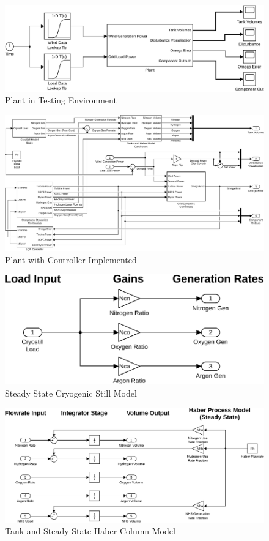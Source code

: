 \begin{figure}[p]
\centering
        \includegraphics[scale=0.7]{images/plant/global.pdf}
        \caption{Plant in Testing Environment}
        \label{fig:global}
\end{figure}
\begin{figure}[p]
\centering
        \includegraphics[scale=0.6]{images/plant2/plant.pdf}
    \caption{Plant with Controller Implemented}
        \label{fig:plant}
\end{figure}
\begin{figure}[p]
\centering
        \includegraphics[scale=0.7]{images/plant2/cryo.pdf}
    \caption{Steady State Cryogenic Still Model}
        \label{fig:cryo}
\end{figure}
\begin{figure}[p]
\centering
        \includegraphics[scale=0.65]{images/plant2/tank.pdf}
    \caption{Tank and Steady State Haber Column Model}
        \label{fig:tank}
\end{figure}

